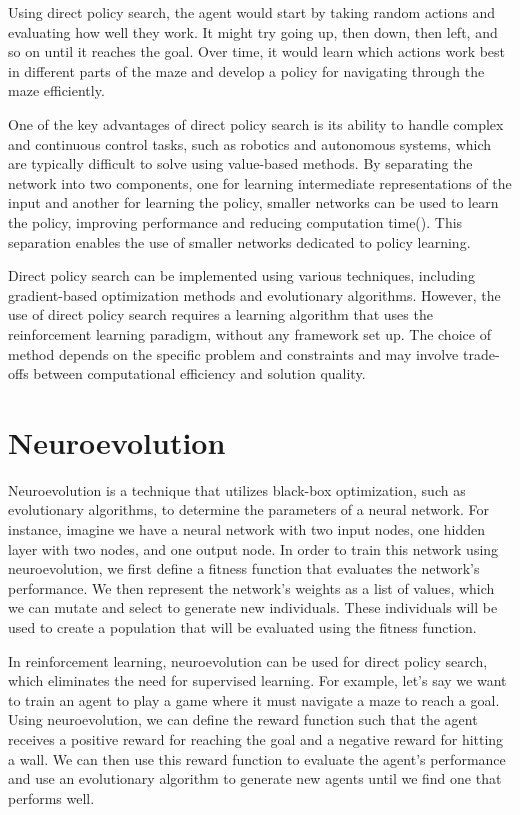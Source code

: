 Using direct policy search, the agent would start by taking random actions and evaluating how well they work. It might try going up, then down, then left, and so on until it reaches the goal. Over time, it would learn which actions work best in different parts of the maze and develop a policy for navigating through the maze efficiently.

One of the key advantages of direct policy search is its ability to handle complex and continuous control tasks, such as robotics and autonomous systems, which are typically difficult to solve using value-based methods. By separating the network into two components, one for learning intermediate representations of the input and another for learning the policy, smaller networks can be used to learn the policy, improving performance and reducing computation time(\cite{cuccu_playing_2019}). This separation enables the use of smaller networks dedicated to policy learning.

Direct policy search can be implemented using various techniques, including gradient-based optimization methods and evolutionary algorithms. However, the use of direct policy search requires a learning algorithm that uses the reinforcement learning paradigm, without any framework set up. The choice of method depends on the specific problem and constraints and may involve trade-offs between computational efficiency and solution quality.

\section{Neuroevolution}

Neuroevolution is a technique that utilizes black-box optimization, such as evolutionary algorithms, to determine the parameters of a neural network. For instance, imagine we have a neural network with two input nodes, one hidden layer with two nodes, and one output node. In order to train this network using neuroevolution, we first define a fitness function that evaluates the network's performance. We then represent the network's weights as a list of values, which we can mutate and select to generate new individuals. These individuals will be used to create a population that will be evaluated using the fitness function.

In reinforcement learning, neuroevolution can be used for direct policy search, which eliminates the need for supervised learning. For example, let's say we want to train an agent to play a game where it must navigate a maze to reach a goal. Using neuroevolution, we can define the reward function such that the agent receives a positive reward for reaching the goal and a negative reward for hitting a wall. We can then use this reward function to evaluate the agent's performance and use an evolutionary algorithm to generate new agents until we find one that performs well.

